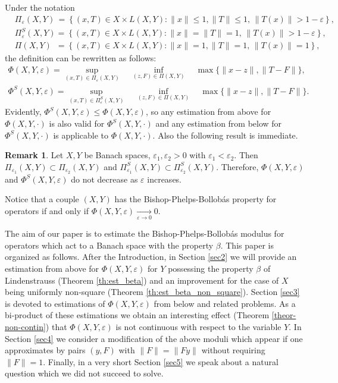 \documentclass[11pt,a4paper]{amsart}
\newcommand{\eps}{\varepsilon}
\numberwithin{equation}{section}
\theoremstyle{plain}
\theoremstyle{definition}
\newtheorem{remark}[theorem]{Remark}
\renewcommand{\leq}{\leqslant}
\begin{document}
Under the notation
\begin{align*}
&\Pi_\eps(X,Y) \,= \left\{(x,T)\in X\times L(X,Y) : \|x\|\leq1, \|T\|\leq1, \, \|T(x)\| > 1-\varepsilon \right\},\\
&\Pi^S_\varepsilon(X,Y) = \left\{(x,T)\in X\times L(X,Y) : \|x\|=\|T\|=1, \, \|T(x)\| > 1-\varepsilon \right\}, \\
&\Pi(X,Y) \,\,\,= \left\{(x,T)\in X\times L(X,Y) : \|x\|=1, \|T\|=1, \, \|T(x)\|= 1 \right\},
\end{align*}
the definition can be rewritten as follows:
\begin{align*}
\Phi(X,Y,\varepsilon)=\underset{(x,T)\in\Pi_\varepsilon(X,Y)}{\sup}\quad\underset{(z,F)\in\Pi(X,Y)}{\inf} \quad \max\{\|x-z\|, \|T-F\|\},
\end{align*} 
\begin{align*}
\Phi^S(X,Y,\varepsilon)=\underset{(x,T)\in\Pi^S_\varepsilon(X,Y)}{\sup}\quad\underset{(z,F)\in\Pi(X,Y)}{\inf} \quad \max\{\|x-z\|, \|T-F\|\}.
\end{align*} 
Evidently, $\Phi^S(X,Y,\eps)\leq\Phi(X,Y,\eps)$, so any estimation from above for $\Phi(X,Y,\cdot)$ is also valid for $\Phi^S(X,Y,\cdot)$ and any estimation from below for $\Phi^S(X,Y,\cdot)$ is applicable to $\Phi(X,Y,\cdot)$. Also the following result is immediate.
\begin{remark} Let $X, Y$ be  Banach spaces, $\eps_1, \eps_2 > 0$ with $\eps_1<\eps_2$. Then
$\Pi_{\varepsilon_1}(X,Y)\subset \Pi_{\varepsilon_2}(X,Y)$ and $\Pi^S_{\varepsilon_1}(X,Y)\subset \Pi^S_{\varepsilon_2}(X,Y)$.
Therefore, $\Phi(X,Y,\varepsilon)$  and $\Phi^S(X,Y,\varepsilon)$ do not decrease as $\eps$ increases.
\end{remark}
Notice that a couple $(X,Y)$ has the Bishop-Phelps-Bollob\'{a}s property for operators if and only if $\Phi(X,Y,\varepsilon)\xrightarrow[\eps\rightarrow 0]{ }0$.

The aim of our paper is to estimate the Bishop-Phelps-Bollob\'{a}s modulus for operators which act to a Banach space with the property $\beta$. This paper is organized as follows. After the Introduction, in Section \ref{sec2} we will provide an estimation from above for $\Phi(X,Y,\varepsilon)$ for $Y$ possessing the property $\beta$ of Lindenstrauss (Theorem \ref{th:est_beta}) and an improvement for the case of $X$ being uniformly non-square (Theorem \ref{th:est_beta_non_square}). Section \ref{sec3} is devoted to estimations of $\Phi(X,Y,\varepsilon)$ from below and related problems. As a bi-product of these  estimations we obtain an interesting effect (Theorem \ref{theor-non-contin})  that $\Phi(X,Y,\varepsilon)$ is not continuous with respect to the variable $Y$. In  Section \ref{sec4} we consider a modification of  the above moduli which appear if one approximates by pairs $(y, F)$ with $\|F\|= \|Fy\|$ without requiring $\|F\| = 1$. Finally, in a very short Section \ref{sec5} we speak about a natural question which we did not succeed to solve.
 
\end{document}
